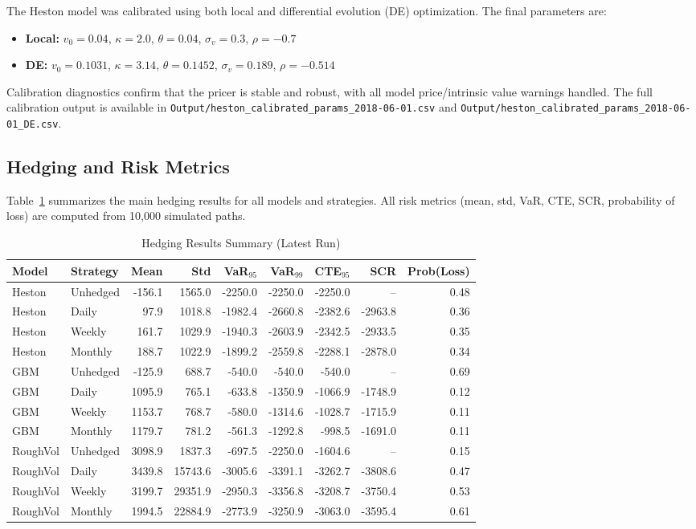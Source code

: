 \documentclass[12pt,a4paper]{report}
\begin{document}
The Heston model was calibrated using both local and differential evolution (DE) optimization. The final parameters are:

\begin{itemize}
    \item \textbf{Local:} $v_0=0.04$, $\kappa=2.0$, $\theta=0.04$, $\sigma_v=0.3$, $\rho=-0.7$
    \item \textbf{DE:} $v_0=0.1031$, $\kappa=3.14$, $\theta=0.1452$, $\sigma_v=0.189$, $\rho=-0.514$
\end{itemize}

Calibration diagnostics confirm that the pricer is stable and robust, with all model price/intrinsic value warnings handled. The full calibration output is available in \texttt{Output/heston\_calibrated\_params\_2018-06-01.csv} and \texttt{Output/heston\_calibrated\_params\_2018-06-01\_DE.csv}.

\subsection{Hedging and Risk Metrics}

Table~\ref{tab:hedging_summary} summarizes the main hedging results for all models and strategies. All risk metrics (mean, std, VaR, CTE, SCR, probability of loss) are computed from 10,000 simulated paths.

\begin{table}[H]
\centering
\caption{Hedging Results Summary (Latest Run)}
\label{tab:hedging_summary}
\begin{tabular}{l l r r r r r r r}
\toprule
Model & Strategy & Mean & Std & VaR$_{95}$ & VaR$_{99}$ & CTE$_{95}$ & SCR & Prob(Loss) \\
\midrule
Heston & Unhedged & -156.1 & 1565.0 & -2250.0 & -2250.0 & -2250.0 & -- & 0.48 \\
Heston & Daily & 97.9 & 1018.8 & -1982.4 & -2660.8 & -2382.6 & -2963.8 & 0.36 \\
Heston & Weekly & 161.7 & 1029.9 & -1940.3 & -2603.9 & -2342.5 & -2933.5 & 0.35 \\
Heston & Monthly & 188.7 & 1022.9 & -1899.2 & -2559.8 & -2288.1 & -2878.0 & 0.34 \\
GBM & Unhedged & -125.9 & 688.7 & -540.0 & -540.0 & -540.0 & -- & 0.69 \\
GBM & Daily & 1095.9 & 765.1 & -633.8 & -1350.9 & -1066.9 & -1748.9 & 0.12 \\
GBM & Weekly & 1153.7 & 768.7 & -580.0 & -1314.6 & -1028.7 & -1715.9 & 0.11 \\
GBM & Monthly & 1179.7 & 781.2 & -561.3 & -1292.8 & -998.5 & -1691.0 & 0.11 \\
RoughVol & Unhedged & 3098.9 & 1837.3 & -697.5 & -2250.0 & -1604.6 & -- & 0.15 \\
RoughVol & Daily & 3439.8 & 15743.6 & -3005.6 & -3391.1 & -3262.7 & -3808.6 & 0.47 \\
RoughVol & Weekly & 3199.7 & 29351.9 & -2950.3 & -3356.8 & -3208.7 & -3750.4 & 0.53 \\
RoughVol & Monthly & 1994.5 & 22884.9 & -2773.9 & -3250.9 & -3063.0 & -3595.4 & 0.61 \\
\bottomrule
\end{tabular}
\end{table}
\end{document}
